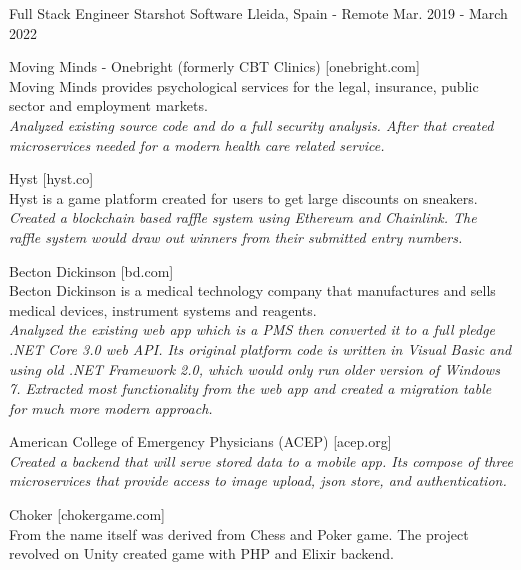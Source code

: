 \begin{cventries}
    \cventry
        {Full Stack Engineer}
        {Starshot Software}
        {Lleida, Spain - Remote}
        {Mar. 2019 - March 2022}
        {
            \begin{cvitems}
                \item
                    {Moving Minds - Onebright (formerly CBT Clinics) [onebright.com]\\
                    Moving Minds provides psychological services for the legal, insurance, public sector and employment markets.\\
                    \emph{Analyzed existing source code and do a full security analysis. After that created microservices needed for a modern health care related service.}}
                \item
                    {Hyst [hyst.co]\\
                    Hyst is a game platform created for users to get large discounts on sneakers.\\
                    \emph{Created a blockchain based raffle system using Ethereum and Chainlink. The raffle system would draw out winners from their submitted entry numbers.}}
                \item
                    {Becton Dickinson [bd.com]\\
                    Becton Dickinson is a medical technology company that manufactures and sells medical devices, instrument systems and reagents.\\
                    \emph{Analyzed the existing web app which is a PMS then converted it to a full pledge .NET Core 3.0 web API. Its original platform code is written in Visual Basic and using old .NET Framework 2.0, which would only run older version of Windows 7. Extracted most functionality from the web app and created a migration table for much more modern approach.}}
                \item
                    {American College of Emergency Physicians (ACEP) [acep.org]\\
                    \emph{Created a backend that will serve stored data to a mobile app. Its compose of three microservices that provide access to image upload, json store, and authentication.}}
                \item
                    {Choker [chokergame.com]\\
                    From the name itself was derived from Chess and Poker game. The project revolved on Unity created game with PHP and Elixir backend.\\
}
\end{cvitems}}
\end{cventries}
